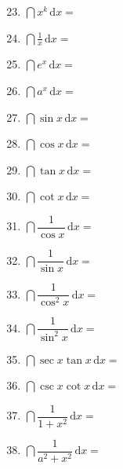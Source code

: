 \documentclass[./book.tex]{subfiles}
\begin{document}
    \begin{minipage}[t]{0.30\textwidth}
        \begin{enumerate}[leftmargin=*, itemsep=1.1em]
            \setcounter{enumi}{22}
            \item $\dint x^k\,\mathrm{d}x =$
            \item $\dint \displaystyle\frac{1}{x}\,\mathrm{d}x =$
            \item $\dint e^x\,\mathrm{d}x =$
            \item $\dint a^x\,\mathrm{d}x =$
            \item $\dint \sin x\,\mathrm{d}x =$
            \item $\dint \cos x\,\mathrm{d}x =$
            \item $\dint \tan x\,\mathrm{d}x =$
            \item $\dint \cot x\,\mathrm{d}x =$
            \item $\dint \dfrac{1}{\cos x}\,\mathrm{d}x =$
            \item $\dint \dfrac{1}{\sin x}\,\mathrm{d}x =$
            \item $\dint \dfrac{1}{\cos^2 x}\,\mathrm{d}x =$
            \item $\dint \dfrac{1}{\sin^2 x}\,\mathrm{d}x =$
            \item $\dint \sec x \tan x\,\mathrm{d}x =$
            \item $\dint \csc x \cot x\,\mathrm{d}x =$
            \item $\dint \dfrac{1}{1 + x^2}\,\mathrm{d}x =$
            \item $\dint \dfrac{1}{a^2 + x^2}\,\mathrm{d}x =$
        \end{enumerate}
    \end{minipage}
    \hfill
\end{document}
